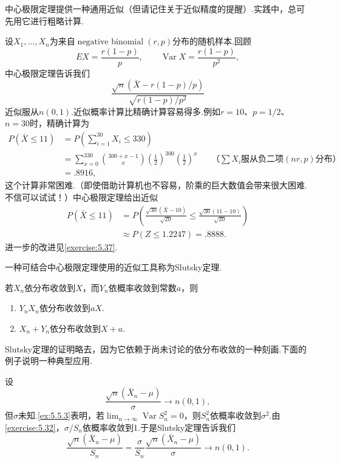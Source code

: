 中心极限定理提供一种通用近似（但请记住关于近似精度的提醒）.实践中，总可先用它进行粗略计算.
\begin{example}[负二项分布的正态近似]\label{ex:5.5.16}
设$X_1,\ldots,X_n$为来自$\operatorname{negative\ binomial}(r,p)$分布的随机样本.回顾
$$EX=\frac{r(1-p)}p,\qquad\operatorname{Var}X=\frac{r(1-p)}{p^2},$$
中心极限定理告诉我们
$$\frac{\sqrt n(\bar X-r(1-p)/p)}{\sqrt{r(1-p)/p^2}}$$
近似服从$n(0,1)$.近似概率计算比精确计算容易得多.例如$r=10$、$p=1/2$、$n=30$时，精确计算为
\begin{align*}
P(\bar X\le11)&=P\left(\sum_{i=1}^{30}X_i\le330\right)\\
&=\sum_{x=0}^{330}\binom{300+x-1}x\left(\frac12\right)^{300}\left(\frac12\right)^x
&&\text{（$\sum X_i$服从负二项$(nr,p)$分布）}\\
&=.8916,
\end{align*}
这个计算非常困难.（即使借助计算机也不容易，阶乘的巨大数值会带来很大困难.不信可以试试！）中心极限定理给出近似
\begin{align*}
P(\bar X\le11)&=P\left(\frac{\sqrt{30}(\bar X-10)}{\sqrt{20}}\le\frac{\sqrt{30}(11-10)}{\sqrt{20}}\right)\\
&\approx P(Z\le1.2247)=.8888.
\end{align*}
进一步的改进见\autoref{exercise:5.37}.
\end{example}
一种可结合中心极限定理使用的近似工具称为Slutsky定理.
\begin{theorem}[Slutsky定理]\label{thm:5.5.17}
若$X_n$依分布收敛到$X$，而$Y_n$依概率收敛到常数$a$，则
\begin{enumerate}[label=\textbf{\alph*.}]
\item $Y_nX_n$依分布收敛到$aX$.
\item $X_n+Y_n$依分布收敛到$X+a$.
\end{enumerate}
\end{theorem}
Slutsky定理的证明略去，因为它依赖于尚未讨论的依分布收敛的一种刻画.下面的例子说明一种典型应用.
\begin{example}[以估计方差作正态近似]\label{ex:5.5.18}
设
$$\frac{\sqrt n(\bar X_n-\mu)}\sigma\to n(0,1),$$
但$\sigma$未知.\autoref{ex:5.5.3}表明，若$\lim_{n\to\infty}\operatorname{Var}S_n^2=0$，则$S_n^2$依概率收敛到$\sigma^2$.由\autoref{exercise:5.32}，$\sigma/S_n$依概率收敛到1.于是Slutsky定理告诉我们
$$\frac{\sqrt n(\bar X_n-\mu)}{S_n}=\frac\sigma{S_n}\frac{\sqrt n(\bar X_n-\mu)}\sigma\to n(0,1).$$
\end{example}
